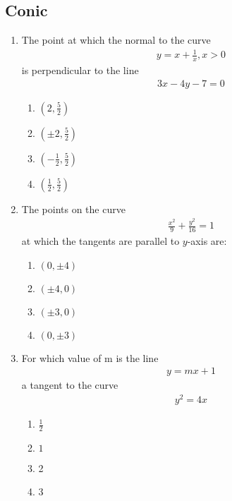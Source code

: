 \documentclass{article}
\providecommand{\brak}[1]{\ensuremath{\left(#1\right)}}
\begin{document}
\begin{center}
    \section{Conic}
    \begin{enumerate}
        
\item The point at which the normal to the curve \\
\begin{align}
    y = x+\frac{1}{x}, x>0 
\end{align}
 is perpendicular to the line\\
 \begin{align}
     3x-4y-7 = 0 
 \end{align}
\begin{enumerate}
    \item $\brak{2,\frac{5}{2}}$   \item $\brak{\pm2,\frac{5}{2}}$  \\

         \item $\brak{-\frac{1}{2},\frac{5}{2}}$    \item $\brak{\frac{1}{2},\frac{5}{2}}$\\
\end{enumerate}
         
         \item The points on the curve\\
         \begin{align}
             \frac{x^2}{9} +\frac{y^2}{16} = 1
         \end{align}
         at which the tangents are parallel to $y$-axis are:
         \begin{enumerate}
             \item $\brak{0,\pm4}$   \item $\brak{\pm4,0}$ 
	     \item  $\brak{\pm3,0}$   \item $\brak{0,\pm3}$
         \end{enumerate}
           
         \item For which value of m is the line\\
         \begin{align}
            y = mx + 1 
         \end{align}a tangent to the curve \\
        \begin{align}
            y^2 = 4x 
        \end{align}
        \begin{enumerate}
            \item  $\frac{1}{2}$  \item $1$

         \item 2  \item 3
        \end{enumerate}
    \end{enumerate}
\end{center}
\end{document}
